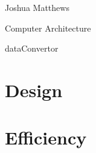\documentclass[letterpaper,12pt]{article}
\begin{document}
\noindent Joshua Matthews

\noindent Computer Architecture

\noindent dataConvertor

\section{Design}


\section{Efficiency}
\end{document}
